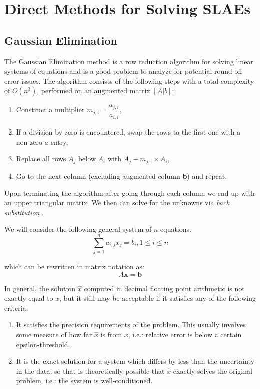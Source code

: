 \documentclass[letterpaper,12pt]{article}
\begin{document}
\section{Direct Methods for Solving SLAEs}
\subsection{Gaussian Elimination}

The Gaussian Elimination method is a row reduction algorithm for solving linear systems of equations and is a good problem to analyze for potential round-off error issues. The algorithm consists of the following steps with a total complexity of $O(n^3)$, performed on an augmented matrix $[A|b]$:
\begin{enumerate}
    \item Construct a multiplier $m_{j,i} = \dfrac{a_{j,i}}{a_{i,i}}$,
    \item If a division by zero is encountered, swap the rows to the first one with a non-zero $a$ entry,
    \item Replace all rows $A_j$ below $A_i$ with $A_j - m_{j,i} \times A_i$,
    \item Go to the next column (excluding augmented column \textbf{b}) and repeat.
\end{enumerate}

Upon terminating the algorithm after going through each column we end up with an upper triangular matrix. We then can solve for the unknowns via \textit{back substitution} \cite{elimination}.

We will consider the following general system of $n$ equations:
\begin{equation}
    \sum_{j=1}^{n}a_{i,j}x_j=b_i, 1 \le i \le n
\end{equation}

which can be rewritten in matrix notation as:
\begin{equation}
    A \textbf{x} = \textbf{b}
\end{equation}

In general, the solution $\hat{x}$ computed in decimal floating point arithmetic is not exactly equal to $x$, but it still may be acceptable if it satisfies any of the following criteria:
\begin{enumerate}
    \item It satisfies the precision requirements of the problem. This usually involves some measure of how far $\hat{x}$ is from $x$, i.e.: relative error is below a certain epsilon-threshold.
    \item It is the exact solution for a system which differs by less than the uncertainty in the data, so that is theoretically possible that $\hat{x}$ exactly solves the original problem, i.e.: the system is well-conditioned.
\end{enumerate}
\end{document}
